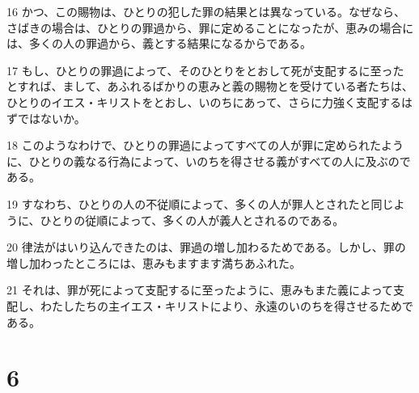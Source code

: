 \par 16 かつ、この賜物は、ひとりの犯した罪の結果とは異なっている。なぜなら、さばきの場合は、ひとりの罪過から、罪に定めることになったが、恵みの場合には、多くの人の罪過から、義とする結果になるからである。
\par 17 もし、ひとりの罪過によって、そのひとりをとおして死が支配するに至ったとすれば、まして、あふれるばかりの恵みと義の賜物とを受けている者たちは、ひとりのイエス・キリストをとおし、いのちにあって、さらに力強く支配するはずではないか。
\par 18 このようなわけで、ひとりの罪過によってすべての人が罪に定められたように、ひとりの義なる行為によって、いのちを得させる義がすべての人に及ぶのである。
\par 19 すなわち、ひとりの人の不従順によって、多くの人が罪人とされたと同じように、ひとりの従順によって、多くの人が義人とされるのである。
\par 20 律法がはいり込んできたのは、罪過の増し加わるためである。しかし、罪の増し加わったところには、恵みもますます満ちあふれた。
\par 21 それは、罪が死によって支配するに至ったように、恵みもまた義によって支配し、わたしたちの主イエス・キリストにより、永遠のいのちを得させるためである。

\chapter{6}

